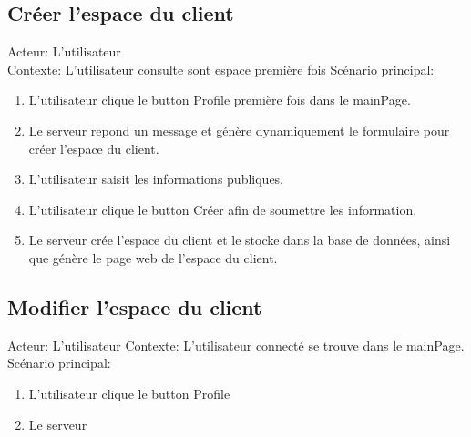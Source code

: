 \documentclass[14px]{article}
\begin{document}
\subsection{Créer l'espace du client}
Acteur: L'utilisateur\\
Contexte: L'utilisateur consulte sont espace première fois
Scénario principal:
\begin{enumerate}
	\item L'utilisateur clique le button Profile première fois dans le mainPage.
	\item Le serveur repond un message et génère dynamiquement le formulaire pour créer l'espace du client.
	\item L'utilisateur saisit les informations publiques.
	\item L'utilisateur clique le button Créer afin de soumettre les information.
	\item Le serveur crée l'espace du client et le stocke dans la base de données, ainsi que génère le page web de l'espace du client.
\end{enumerate}

\subsection{Modifier l'espace du client}
Acteur: L'utilisateur
Contexte: L'utilisateur connecté se trouve dans le mainPage.
Scénario principal:
\begin{enumerate}
	\item L'utilisateur clique le button Profile
	\item Le serveur
\end{enumerate}
\end{document}
